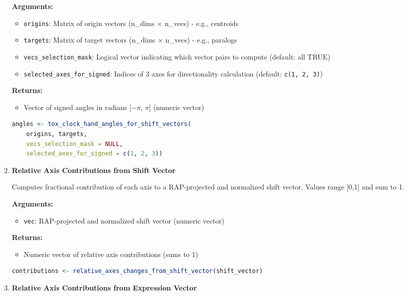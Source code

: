 \documentclass[11pt]{article}
\begin{document}
\begin{enumerate}
    \textbf{Arguments:}
    \begin{itemize}
        \item \texttt{origins}: Matrix of origin vectors (n\_dims × n\_vecs) - e.g., centroids
        \item \texttt{targets}: Matrix of target vectors (n\_dims × n\_vecs) - e.g., paralogs
        \item \texttt{vecs\_selection\_mask}: Logical vector indicating which vector pairs to compute (default: all TRUE)
        \item \texttt{selected\_axes\_for\_signed}: Indices of 3 axes for directionality calculation (default: \texttt{c(1, 2, 3)})
    \end{itemize}
    \textbf{Returns:}
    \begin{itemize}
        \item Vector of signed angles in radians [$-\pi$, $\pi$] (numeric vector)
    \end{itemize}
\begin{lstlisting}[language=R, caption={Batch Angle Calculation for Vector Pairs}]
angles <- tox_clock_hand_angles_for_shift_vectors(
    origins, targets, 
    vecs_selection_mask = NULL,
    selected_axes_for_signed = c(1, 2, 3))
\end{lstlisting}

    \item \textbf{Relative Axis Contributions from Shift Vector}

    Computes fractional contribution of each axis to a RAP-projected and normalized shift vector. Values range [0,1] and sum to 1.
    
    \textbf{Arguments:}
    \begin{itemize}
        \item \texttt{vec}: RAP-projected and normalized shift vector (numeric vector)
    \end{itemize}
    \textbf{Returns:}
    \begin{itemize}
        \item Numeric vector of relative axis contributions (sums to 1)
    \end{itemize}
\begin{lstlisting}[language=R, caption={Shift Vector Axis Contributions}]
contributions <- relative_axes_changes_from_shift_vector(shift_vector)
\end{lstlisting}

    \item \textbf{Relative Axis Contributions from Expression Vector}


\end{enumerate}
\end{document}
